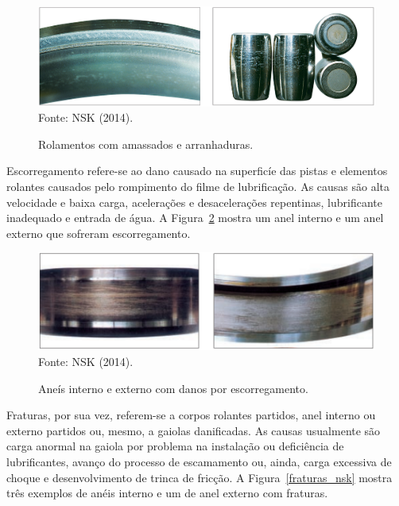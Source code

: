 \documentclass[
	12pt,				
	oneside,			
	a4paper,			
	english,			
	brazil,			
	]{abntex2ppgsi}
\begin{document}
\begin{figure}[H]
\centering
\caption {Rolamentos com amassados e arranhaduras.}
\includegraphics[width=\textwidth,height=\textheight,keepaspectratio]{arranhaduras_nsk} \\
Fonte: NSK (2014).
\label{arranhaduras_nsk}
\end{figure}

Escorregamento refere-se ao dano causado na superficíe das pistas e elementos rolantes causados pelo rompimento do filme de lubrificação. As causas são alta velocidade e baixa carga, acelerações e desacelerações repentinas, lubrificante inadequado e entrada de água. A Figura~\ref{escorregamento_nsk} mostra um anel interno e um anel externo que sofreram escorregamento. 

\begin{figure}[H]
\centering
\caption {Aneís interno e externo com danos por escorregamento.}
\includegraphics[width=\textwidth,height=\textheight,keepaspectratio]{escorregamento_nsk} \\
Fonte: NSK (2014).
\label{escorregamento_nsk}
\end{figure}

Fraturas, por sua vez, referem-se a corpos rolantes partidos, anel interno ou externo partidos ou, mesmo, a gaiolas danificadas. As causas usualmente são carga anormal na gaiola por problema na instalação ou deficiência de lubrificantes, avanço do processo de escamamento ou, ainda, carga excessiva de choque e desenvolvimento de trinca de fricção. A Figura~\ref{fraturas_nsk} mostra três exemplos de anéis interno e um de anel externo com fraturas. 
\end{document}
